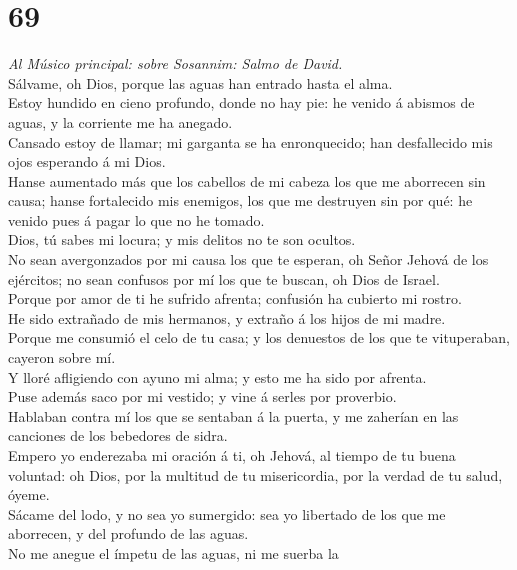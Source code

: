 \hypertarget{section-68}{%
\section{69}\label{section-68}}

 \emph{Al Músico principal: sobre Sosannim: Salmo de
David.}\\
Sálvame, oh Dios, porque las aguas han entrado hasta el alma.\\
 Estoy hundido en cieno profundo, donde no hay pie: he
venido á abismos de aguas, y la corriente me ha anegado.\\
 Cansado estoy de llamar; mi garganta se ha enronquecido;
han desfallecido mis ojos esperando á mi Dios.\\
 Hanse aumentado más que los cabellos de mi cabeza los que
me aborrecen sin causa; hanse fortalecido mis enemigos, los que me
destruyen sin por qué: he venido pues á pagar lo que no he tomado.\\
 Dios, tú sabes mi locura; y mis delitos no te son
ocultos.\\
 No sean avergonzados por mi causa los que te esperan, oh
Señor Jehová de los ejércitos; no sean confusos por mí los que te
buscan, oh Dios de Israel.\\
 Porque por amor de ti he sufrido afrenta; confusión ha
cubierto mi rostro.\\
 He sido extrañado de mis hermanos, y extraño á los hijos de
mi madre.\\
 Porque me consumió el celo de tu casa; y los denuestos de
los que te vituperaban, cayeron sobre mí.\\
 Y lloré afligiendo con ayuno mi alma; y esto me ha sido
por afrenta.\\
 Puse además saco por mi vestido; y vine á serles por
proverbio.\\
 Hablaban contra mí los que se sentaban á la puerta, y me
zaherían en las canciones de los bebedores de sidra.\\
 Empero yo enderezaba mi oración á ti, oh Jehová, al tiempo
de tu buena voluntad: oh Dios, por la multitud de tu misericordia, por
la verdad de tu salud, óyeme.\\
 Sácame del lodo, y no sea yo sumergido: sea yo libertado
de los que me aborrecen, y del profundo de las aguas.\\
 No me anegue el ímpetu de las aguas, ni me suerba la

